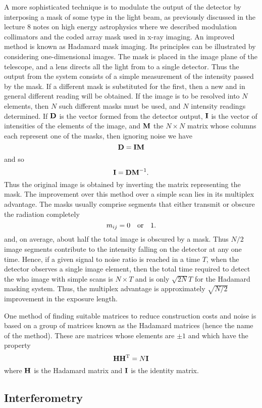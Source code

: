 \documentclass{article}
\begin{document}
A more sophisticated technique is to modulate the output of the detector by interposing a mask of some type in the light beam, as previously discussed in the lecture 8 notes on high energy astrophysics where we described modulation collimators and the coded array mask used in x-ray imaging. An improved method is known as Hadamard mask imaging. Its principles can be illustrated by considering one-dimensional images. The mask is placed in the image plane of the telescope, and a lens directs all the light from to a single detector. Thus the output from the system consists of a simple measurement of the intensity passed by the mask. If a different mask is substituted for the first, then a new and in general different reading will be obtained. If the image is to be resolved into
$N$ elements, then $N$ such different masks must be used, and $N$ intensity readings determined. If ${\bf D}$ is the vector formed from the detector output, ${\bf I}$ is the vector of intensities of the elements of the image, and ${\bf M}$ the $N\times N$ matrix whose columns each represent one of the masks, then ignoring noise we have
\[
{\bf D}={\bf IM}
\]
and so 
\[
{\bf I}={\bf DM}^{-1}.
\]
Thus the original image is obtained by inverting the matrix representing the mask. The improvement over this method over a simple scan lies in its multiplex advantage. The masks usually comprise segments that either transmit or obscure the radiation completely 
\[ 
m_{ij}=0 \quad {\rm or} \quad 1.
\]
and, on average, about half the total image is obscured by a mask. Thus $N/2$ image segments contribute to the intensity falling on the detector at any one time. Hence, if 
a given signal to noise ratio is reached in a time $T$, when the detector observes a single image element, then the total time required to detect the who image with simple scans is $N\times T$ and is only $\sqrt{2N}T$ for the Hadamard masking system. Thus, the multiplex advantage is approximately $\sqrt{N/2}$ improvement in the exposure length. 

One method of finding suitable matrices to reduce construction costs and noise is based on a group of matrices known as the Hadamard matrices (hence the name of the method). These are matrices whose elements are $\pm 1$ and which have the property
\[
{\bf H}{\bf H}^{\rm T}=N{\bf I}
\]
where ${\bf H}$ is the Hadamard matrix and ${\bf I}$ is the identity matrix. 

\subsection{Interferometry}
\end{document}

